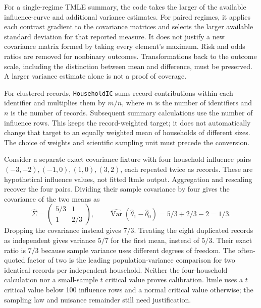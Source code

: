 For a single-regime TMLE summary, the code takes the larger of the available
influence-curve and additional variance estimates. For paired regimes, it
applies each contrast gradient to the covariance matrices and selects the
larger available standard deviation for that reported measure. It does not
justify a new covariance matrix formed by taking every element's maximum.
Risk and odds ratios are removed for nonbinary outcomes. Transformations back
to the outcome scale, including the distinction between mean and difference,
must be preserved. A larger variance estimate alone is not a proof of
coverage.\citep{exec23_ltmle_source}

For clustered records, \texttt{HouseholdIC} sums record contributions within
each identifier and multiplies them by $m/n$, where $m$ is the number of
identifiers and $n$ is the number of records. Subsequent summary calculations
use the number of influence rows. This keeps the record-weighted target;
it does not automatically change that target to an equally weighted mean
of households of different sizes. The choice of weights and scientific
sampling unit must precede the conversion.

Consider a separate exact covariance fixture with four household influence
pairs $(-3,-2),(-1,0),(1,0),(3,2)$, each repeated twice as records. These are
hypothetical influence values, not fitted ltmle output. Aggregation and
rescaling recover the four pairs. Dividing their sample covariance by four
gives the covariance of the two means as
\begin{equation}
 \widehat\Sigma=\begin{pmatrix}5/3&1\\1&2/3\end{pmatrix},\qquad
 \widehat{\operatorname{Var}}(\widehat\theta_1-\widehat\theta_0)
 =5/3+2/3-2=1/3.
 \label{exec23:ltmle-cluster}
\end{equation}
Dropping the covariance instead gives $7/3$. Treating the eight duplicated
records as independent gives variance $5/7$ for the first mean, instead of
$5/3$. Their exact ratio is $7/3$ because sample variance uses different
degrees of freedom. The often-quoted factor of two is the leading
population-variance comparison for two identical records per independent
household. Neither the four-household calculation nor a small-sample
$t$ critical value proves calibration. ltmle uses a $t$ critical value below
100 influence rows and a normal critical value otherwise; the sampling law
and nuisance remainder still need justification.
\citep{exec23_ltmle_source,exec23_ltmle_exact}

